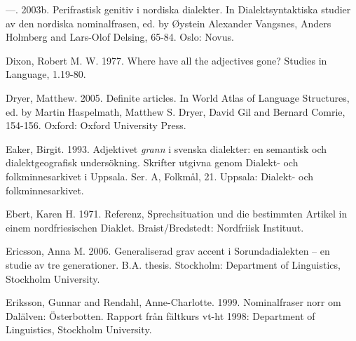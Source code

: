 \begin{styleBodytextC}
—. 2003b. Perifrastisk genitiv i nordiska dialekter. In Dialektsyntaktiska studier av den nordiska nominalfrasen, ed. by Øystein Alexander Vangsnes, Anders Holmberg and Lars-Olof Delsing, 65-84. Oslo: Novus.

\end{styleBodytextC}

\begin{styleBodytextC}
Dixon, Robert M. W. 1977. Where have all the adjectives gone? Studies in Language, 1.19-80.

\end{styleBodytextC}

\begin{styleBodytextC}
Dryer, Matthew. 2005. Definite articles. In World Atlas of Language Structures, ed. by Martin Haspelmath, Matthew S. Dryer, David Gil and Bernard Comrie, 154-156. Oxford: Oxford University Press.

\end{styleBodytextC}

\begin{styleBodytextC}
Eaker, Birgit. 1993. Adjektivet \textit{grann} i svenska dialekter: en semantisk och dialektgeografisk undersökning. Skrifter utgivna genom Dialekt- och folkminnesarkivet i Uppsala. Ser. A, Folkmål, 21. Uppsala: Dialekt- och folkminnesarkivet.

\end{styleBodytextC}

\begin{styleBodytextC}
Ebert, Karen H. 1971. Referenz, Sprechsituation und die bestimmten Artikel in einem nordfriesischen Diaklet. Braist/Bredstedt: Nordfriisk Instituut.

\end{styleBodytextC}

\begin{styleBodytextC}
Ericsson, Anna M. 2006. Generaliserad grav accent i Sorundadialekten – en studie av tre generationer. B.A. thesis. Stockholm: Department of Linguistics, Stockholm University.

\end{styleBodytextC}

\begin{styleBodytextC}
Eriksson, Gunnar and Rendahl, Anne-Charlotte. 1999. Nominalfraser norr om Dalälven: Österbotten. Rapport från fältkurs vt-ht 1998: Department of Linguistics, Stockholm University.

\end{styleBodytextC}

